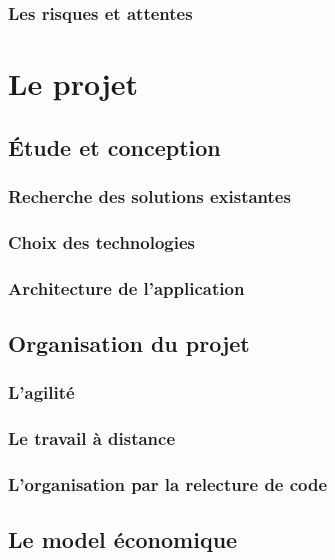 \documentclass[twoside, 12pt]{report}
\begin{document}
        \section{Les risques et attentes}

\part{Le projet}

    \chapter{Étude et conception}

        \section{Recherche des solutions existantes}

        \section{Choix des technologies}

        \section{Architecture de l'application}

    \chapter{Organisation du projet}

        \section{L'agilité}

        \section{Le travail à distance}

        \section{L'organisation par la relecture de code}

    \chapter{Le model économique}
\end{document}
